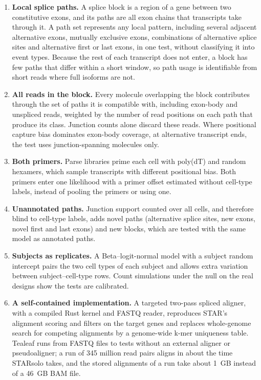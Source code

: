 \documentclass[11pt]{article}
\begin{document}
\begin{enumerate}[leftmargin=*]
  \item \textbf{Local splice paths.} A splice block is a region of a gene between two constitutive exons, and its paths are all exon chains that transcripts take through it. A path set represents any local pattern, including several adjacent alternative exons, mutually exclusive exons, combinations of alternative splice sites and alternative first or last exons, in one test, without classifying it into event types. Because the rest of each transcript does not enter, a block has few paths that differ within a short window, so path usage is identifiable from short reads where full isoforms are not.
  \item \textbf{All reads in the block.} Every molecule overlapping the block contributes through the set of paths it is compatible with, including exon-body and unspliced reads, weighted by the number of read positions on each path that produce its class. Junction counts alone discard these reads. Where positional capture bias dominates exon-body coverage, at alternative transcript ends, the test uses junction-spanning molecules only.
  \item \textbf{Both primers.} Parse libraries prime each cell with poly(dT) and random hexamers, which sample transcripts with different positional bias. Both primers enter one likelihood with a primer offset estimated without cell-type labels, instead of pooling the primers or using one.
  \item \textbf{Unannotated paths.} Junction support counted over all cells, and therefore blind to cell-type labels, adds novel paths (alternative splice sites, new exons, novel first and last exons) and new blocks, which are tested with the same model as annotated paths.
  \item \textbf{Subjects as replicates.} A Beta--logit-normal model with a subject random intercept pairs the two cell types of each subject and allows extra variation between subject--cell-type rows. Count simulations under the null on the real designs show the tests are calibrated.
  \item \textbf{A self-contained implementation.} A targeted two-pass spliced aligner, with a compiled Rust kernel and FASTQ reader, reproduces STAR's alignment scoring and filters on the target genes and replaces whole-genome search for competing alignments by a genome-wide k-mer uniqueness table. Tealeaf runs from FASTQ files to tests without an external aligner or pseudoaligner; a run of 345 million read pairs aligns in about the time STARsolo takes, and the stored alignments of a run take about 1~GB instead of a 46~GB BAM file.
\end{enumerate}
\end{document}
